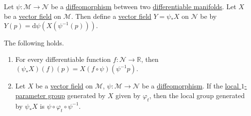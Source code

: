 \begin{definition}[Pushforward]\label{def:push-forward}
	Let \(\psi \colon \mathcal{M} \to \mathcal{N} \) be a \hyperref[def:diffeomorphism]{diffeomorphism} between two \hyperref[def:smooth-manifold]{differentiable manifolds}. Let \(X\) be a \hyperref[def:vector-field]{vector field} on \(\mathcal{M} \). Then define a \hyperref[def:vector-field]{vector field} \(Y = \psi _\ast X\) on \(\mathcal{N} \) be by \(Y(p) = \mathrm{d} \psi (X(\psi ^{-1} (p)))\).
\end{definition}

\begin{lemma}
	The following holds.
	\begin{enumerate}
		\item For every differentiable function \(f\colon \mathcal{N} \to \mathbb{R} \), then \((\psi _\ast X) (f)(p) = X(f\circ \psi ) (\psi ^{-1} p)\).
		\item Let \(X\) be a \hyperref[def:vector-field]{vector field} on \(\mathcal{M} \), \(\psi \colon \mathcal{M} \to \mathcal{N} \) be a \hyperref[def:diffeomorphism]{diffeomorphism}. If the \hyperref[def:local-1-parameter-group]{local \(1\)-parameter group} generated by \(X\) given by \(\varphi _t\), then the local group generated by \(\psi _\ast X\) is \(\psi \circ \varphi _t \circ \psi ^{-1} \).
	\end{enumerate}
\end{lemma}